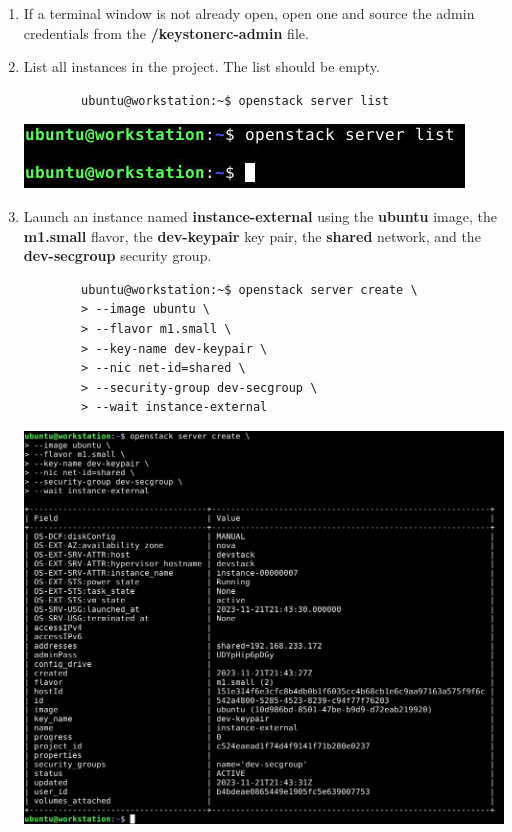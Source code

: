 \documentclass[letterpaper, 12pt]{article}
\begin{document}
\begin{enumerate}
    \item If a terminal window is not already open, open one and source the admin credentials from the 
    \textbf{\texttildemid/keystonerc-admin} file.

    \item List all instances in the project. The list should be empty.
    \begin{lstlisting}
        ubuntu@workstation:~$ openstack server list
    \end{lstlisting}

    \begin{center}
        \includegraphics[width=\linewidth]{images/part5/step2.png}
    \end{center}

    \item Launch an instance named \textbf{instance-external} using the \textbf{ubuntu} image, the \textbf{m1.small}
    flavor, the \textbf{dev-keypair} key pair, the \textbf{shared} network, and the \textbf{dev-secgroup} security
    group.
    \begin{lstlisting}
        ubuntu@workstation:~$ openstack server create \
        > --image ubuntu \
        > --flavor m1.small \
        > --key-name dev-keypair \
        > --nic net-id=shared \
        > --security-group dev-secgroup \
        > --wait instance-external
    \end{lstlisting}

    \begin{center}
        \includegraphics[width=\linewidth]{images/part5/step3.png}
    \end{center}


\end{enumerate}
\end{document}
